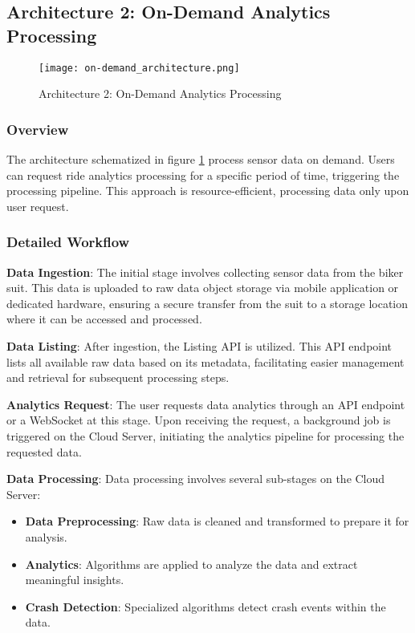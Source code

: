 \subsection{Architecture 2: On-Demand Analytics Processing}

\begin{figure}[htbp]
    \centering
    \texttt{[image: on-demand\_architecture.png]}
    \caption{Architecture 2: On-Demand Analytics Processing}
    \label{fig:on-demand_architecture}
\end{figure}

\subsubsection{Overview}
The architecture schematized in figure \ref{fig:on-demand_architecture} process sensor data on demand. Users can request ride analytics processing for a specific period of time, triggering the processing pipeline. This approach is resource-efficient, processing data only upon user request.

\subsubsection{Detailed Workflow}

\textbf{Data Ingestion}:  
The initial stage involves collecting sensor data from the biker suit. This data is uploaded to raw data object storage via mobile application or dedicated hardware, ensuring a secure transfer from the suit to a storage location where it can be accessed and processed.

\textbf{Data Listing}:  
After ingestion, the Listing API is utilized. This API endpoint lists all available raw data based on its metadata, facilitating easier management and retrieval for subsequent processing steps.

\textbf{Analytics Request}:  
The user requests data analytics through an API endpoint or a WebSocket at this stage. Upon receiving the request, a background job is triggered on the Cloud Server, initiating the analytics pipeline for processing the requested data.

\textbf{Data Processing}:  
Data processing involves several sub-stages on the Cloud Server:
\begin{itemize}
    \item \textbf{Data Preprocessing}: Raw data is cleaned and transformed to prepare it for analysis.
    \item \textbf{Analytics}: Algorithms are applied to analyze the data and extract meaningful insights.
    \item \textbf{Crash Detection}: Specialized algorithms detect crash events within the data.
\end{itemize}

